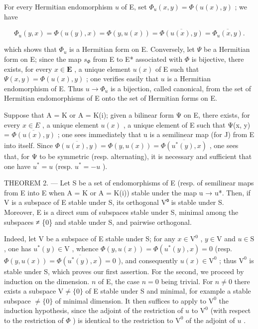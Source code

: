 For every Hermitian endomorphism \(u\) of E, set \(\Phi_{u}(x,y)=\Phi(u(x),y)\) ; we have

\[
\Phi_ {u} (y, x) = \Phi (u (y), x) = \Phi (y, u (x)) = \overline {{\Phi (u (x) , y)}} = \overline {{\Phi_ {u} (x , y)}}.
\]

which shows that \(\Phi_{u}\) is a Hermitian form on E. Conversely, let \(\Psi\) be a Hermitian form on E; since the map \(s_{\Phi}\) from E to E* associated with \(\Phi\) is bijective, there exists, for every \(x \in \mathbf{E}\) , a unique element \(u(x)\) of E such that \(\Psi(x, y) = \Phi(u(x), y)\) ; one verifies easily that \(u\) is a Hermitian endomorphism of E. Thus \(u \to \Phi_{u}\) is a bijection, called canonical, from the set of Hermitian endomorphisms of E onto the set of Hermitian forms on E.

Suppose that A = K or A = K(i); given a bilinear form Ψ on E, there exists, for every \(x \in E\) , a unique element \(u(x)\) , a unique element of E such that Ψ(x, y) = \(\overline{\Phi(u(x), y)}\) ; one sees immediately that u is a semilinear map (for J) from E into itself. Since \(\overline{\Phi(u(x), y)} = \Phi(y, u(x)) = \overline{\Phi(u^{*}(y), x)}\) , one sees that, for Ψ to be symmetric (resp. alternating), it is necessary and sufficient that one have \(u^{*} = u\) (resp. \(u^{*} = -u\) ).

THEOREM 2. --- Let S be a set of endomorphisms of E (resp. of semilinear maps from E into E when A = K or A = K(i)) stable under the map u → u*. Then, if V is a subspace of E stable under S, its orthogonal V⁰ is stable under S. Moreover, E is a direct sum of subspaces stable under S, minimal among the subspaces ≠ \{0\} and stable under S, and pairwise orthogonal.

Indeed, let V be a subspace of E stable under S; for any \(x \in \mathrm{V}^0\) , \(y \in \mathrm{V}\) and \(u \in \mathrm{S}\) , one has \(u^*(y) \in \mathrm{V}\) , whence \(\Phi(y, u(x)) = \Phi(u^*(y), x) = 0\) (resp. \(\Phi(y, u(x)) = \overline{\Phi(u^*(y), x)} = 0\) ), and consequently \(u(x) \in \mathrm{V}^0\) ; thus \(\mathrm{V}^0\) is stable under S, which proves our first assertion. For the second, we proceed by induction on the dimension. \(n\) of E, the case \(n = 0\) being trivial. For \(n \neq 0\) there exists a subspace \(\mathrm{V} \neq \{0\}\) of E stable under S and minimal, for example a stable subspace \(\neq \{0\}\) of minimal dimension. It then suffices to apply to \(\mathrm{V}^0\) the induction hypothesis, since the adjoint of the restriction of \(u\) to \(\mathrm{V}^0\) (with respect to the restriction of \(\Phi\) ) is identical to the restriction to \(\mathrm{V}^0\) of the adjoint of \(u\) .

